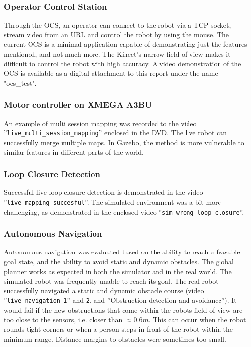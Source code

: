 \subsubsection{Operator Control Station}

Through the \ac{OCS}, an operator can connect to the robot via a TCP socket, stream video from an URL and control the robot by using the mouse. The current \ac{OCS} is a minimal application capable of demonstrating just the features mentioned, and not much more. The Kinect's narrow field of view makes it difficult to control the robot with high accuracy. A video demonstration of the \ac{OCS} is available as a digital attachment to this report under the name "ocs\_test".

\subsubsection{Motor controller on XMEGA A3BU}

An example of multi session mapping was recorded to the video ''\texttt{live\_multi\_session\_mapping}'' enclosed in the DVD. The live robot can successfully merge multiple maps. In Gazebo, the method is more vulnerable to similar features in different parts of the world.

\subsubsection{Loop Closure Detection}

Successful live loop closure detection is demonstrated in the video ''\texttt{live\_mapping\_succesful}''. The simulated environment was a bit more challenging, as demonstrated in the enclosed video ''\texttt{sim\_wrong\_loop\_closure}''.

\subsubsection{Autonomous Navigation}

Autonomous navigation was evaluated based on the ability to reach a feasable goal state, and the ability to avoid static and dynamic obstacles. The global planner works as expected in both the simulator and in the real world. The simulated robot was frequently unable to reach its goal. The real robot successfully navigated a static and dynamic obstacle course (video ''\texttt{live\_navigation\_1}'' and \texttt{2}, and ''Obstruction detection and avoidance''). It would fail if the new obstructions that come within the robots field of view are too close to the sensors, i.e. closer than $\approx 0.6m $. This can occur when the robot rounds tight corners or when a person steps in front of the robot within the minimum range. Distance margins to obstacles were sometimes too small.



